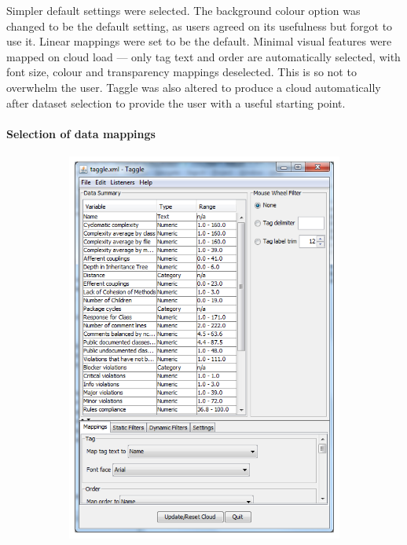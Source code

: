 Simpler default settings were selected. The background colour option was changed to be the default setting, as users agreed on its usefulness but forgot to use it. Linear mappings were set to be the default. Minimal visual features were mapped on cloud load --- only tag text and order are automatically selected, with font size, colour and transparency mappings deselected. This is so not to overwhelm the user. Taggle was also altered to produce a cloud automatically after dataset selection to provide the user with a useful starting point.

\paragraph{Selection of data mappings}

\begin{figure}[!htb]
\centering
\begin{subfigure}{.5\textwidth}
	\centering
	\includegraphics[scale=1.20]{datasummary1.png}

\end{subfigure}
\end{figure}
